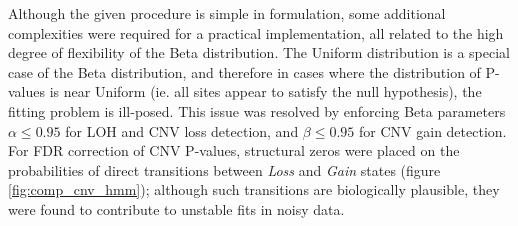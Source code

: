 \documentclass[thesis.tex]{subfiles}
\begin{document}
Although the given procedure is simple in formulation, some additional complexities were required for a practical implementation, all related to the high degree of flexibility of the Beta distribution.  The Uniform distribution is a special case of the Beta distribution, and therefore in cases where the distribution of P-values is near Uniform (ie. all sites appear to satisfy the null hypothesis), the fitting problem is ill-posed.  This issue was resolved by enforcing Beta parameters $\alpha \leq 0.95$ for \gls{LOH} and \gls{CNV} loss detection, and $\beta \leq 0.95$ for \gls{CNV} gain detection.  For \gls{FDR} correction of \gls{CNV} P-values, structural zeros were placed on the probabilities of direct transitions between \emph{Loss} and \emph{Gain} states (figure \ref{fig:comp_cnv_hmm}); although such transitions are biologically plausible, they were found to contribute to unstable fits in noisy data.

%
%
\end{document}
